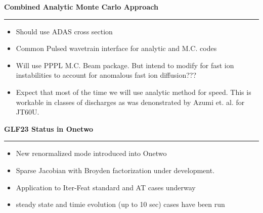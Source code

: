      \begin{slide}          \setlength{\topmargin}{-0.5in}
       \begin{center}
           \Large\bfseries Combined Analytic Monte Carlo Approach
        \end{center}
        \normalsize  

        \bigskip
        \hrule height4pt

         \begin{itemize} \bfseries \tiny
           \item Should use ADAS cross section 
           \item Common Pulsed wavetrain interface for
                 analytic and M.C. codes
           \item Will use PPPL M.C. Beam package. But intend
                 to modify for fast ion instabilities
                 to account for anomalous fast ion diffusion???
           \item Expect that most of the time we will use 
             analytic method for speed. This is workable in
             classes of discharges as was denonstrated by
             Azumi et. al. for JT60U.

    \end{itemize}
    \end{slide}


    \begin{slide}          \setlength{\topmargin}{0. in}
       \begin{center}
           \Large\bfseries GLF23 Status in Onetwo
        \bigskip
        \end{center}  
        \hrule height4pt
         \begin{itemize} \bfseries \tiny
          \item New renormalized mode introduced into Onetwo
            \item Sparse Jacobian with Broyden factorization
                  under development.
          \item Application to Iter-Feat standard and AT cases underway
          \item steady state and timie evolution (up to 10 sec) cases
            have been run

      \setlength{\leftmargin}{10. in}

    \end{itemize}
    \end{slide}
   
